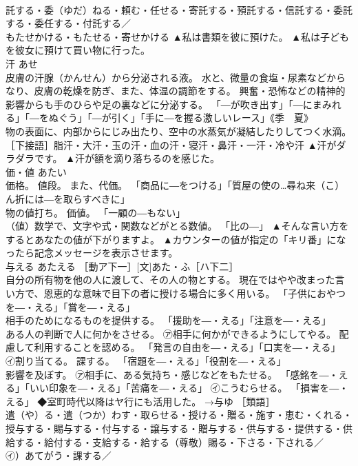 \documentclass[8pt]{extreport}
\begin{document}
\begin{CJK}{UTF8}{min}
\\	託する・委（ゆだ）ねる・頼む・任せる・寄託する・預託する・信託する・委託する・委任する・付託する／
\\	もたせかける・もたせる・寄せかける	▲私は書類を彼に預けた。 ▲私は子どもを彼女に預けて買い物に行った。
\\	汗	あせ	
\\	皮膚の汗腺（かんせん）から分泌される液。 水と、微量の食塩・尿素などからなり、皮膚の乾燥を防ぎ、また、体温の調節をする。 興奮・恐怖などの精神的影響からも手のひらや足の裏などに分泌する。 「―が吹き出す」「―にまみれる」「―をぬぐう」「―が引く」「手に―を握る激しいレース」《季　夏》 
\\	物の表面に、内部からにじみ出たり、空中の水蒸気が凝結したりしてつく水滴。 ［下接語］脂汗・大汗・玉の汗・血の汗・寝汗・鼻汗・一汗・冷や汗	▲汗がダラダラです。 ▲汗が額を滴り落ちるのを感じた。
\\	価・値	あたい	
\\	価格。 値段。 また、代価。 「商品に―をつける」「質屋の使の…尋ね来（こ）ん折には―を取らすべきに」 
\\	物の値打ち。 価値。 「一顧の―もない」 
\\	（値）数学で、文字や式・関数などがとる数値。 「比の―」	▲そんな言い方をするとあなたの値が下がりますよ。 ▲カウンターの値が指定の「キリ番」になったら記念メッセージを表示させます。
\\	与える	あたえる	［動ア下一］[文]あた・ふ［ハ下二］ 
\\	自分の所有物を他の人に渡して、その人の物とする。 現在ではやや改まった言い方で、恩恵的な意味で目下の者に授ける場合に多く用いる。 「子供におやつを―・える」「賞を―・える」 
\\	相手のためになるものを提供する。 「援助を―・える」「注意を―・える」 
\\	ある人の判断で人に何かをさせる。 ㋐相手に何かができるようにしてやる。 配慮して利用することを認める。 「発言の自由を―・える」「口実を―・える」 ㋑割り当てる。 課する。 「宿題を―・える」「役割を―・える」 
\\	影響を及ぼす。 ㋐相手に、ある気持ち・感じなどをもたせる。 「感銘を―・える」「いい印象を―・える」「苦痛を―・える」 ㋑こうむらせる。 「損害を―・える」 ◆室町時代以降はヤ行にも活用した。 →与ゆ ［類語］
\\	遣（や）る・遣（つか）わす・取らせる・授ける・贈る・施す・恵む・くれる・授与する・賜与する・付与する・譲与する・贈与する・供与する・提供する・供給する・給付する・支給する・給する（尊敬）賜る・下さる・下される／
\\	㋑）あてがう・課する／

\end{CJK}
\end{document}
